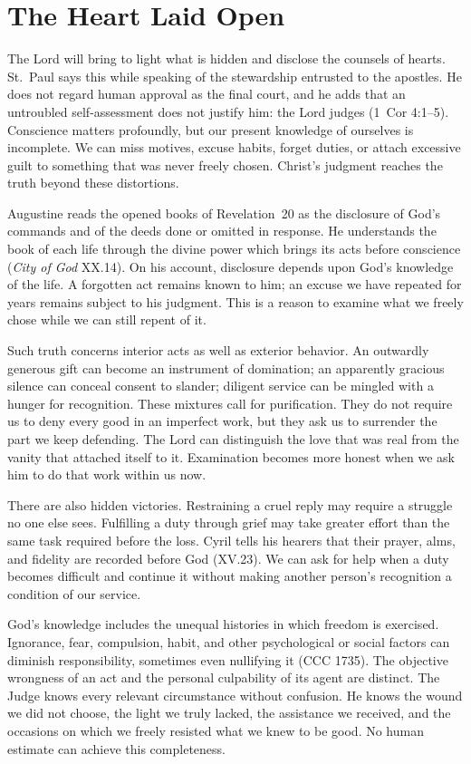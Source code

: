\section{The Heart Laid Open}

The Lord will bring to light what is hidden and disclose the counsels of hearts. St.~Paul says this while speaking of the stewardship entrusted to the apostles. He does not regard human approval as the final court, and he adds that an untroubled self-assessment does not justify him: the Lord judges (1~Cor 4:1--5). Conscience matters profoundly, but our present knowledge of ourselves is incomplete. We can miss motives, excuse habits, forget duties, or attach excessive guilt to something that was never freely chosen. Christ's judgment reaches the truth beyond these distortions.

Augustine reads the opened books of Revelation~20 as the disclosure of God's commands and of the deeds done or omitted in response. He understands the book of each life through the divine power which brings its acts before conscience (\emph{City of God} XX.14). On his account, disclosure depends upon God's knowledge of the life. A forgotten act remains known to him; an excuse we have repeated for years remains subject to his judgment. This is a reason to examine what we freely chose while we can still repent of it.

Such truth concerns interior acts as well as exterior behavior. An outwardly generous gift can become an instrument of domination; an apparently gracious silence can conceal consent to slander; diligent service can be mingled with a hunger for recognition. These mixtures call for purification. They do not require us to deny every good in an imperfect work, but they ask us to surrender the part we keep defending. The Lord can distinguish the love that was real from the vanity that attached itself to it. Examination becomes more honest when we ask him to do that work within us now.

There are also hidden victories. Restraining a cruel reply may require a struggle no one else sees. Fulfilling a duty through grief may take greater effort than the same task required before the loss. Cyril tells his hearers that their prayer, alms, and fidelity are recorded before God (XV.23). We can ask for help when a duty becomes difficult and continue it without making another person's recognition a condition of our service.

God's knowledge includes the unequal histories in which freedom is exercised. Ignorance, fear, compulsion, habit, and other psychological or social factors can diminish responsibility, sometimes even nullifying it (CCC 1735). The objective wrongness of an act and the personal culpability of its agent are distinct. The Judge knows every relevant circumstance without confusion. He knows the wound we did not choose, the light we truly lacked, the assistance we received, and the occasions on which we freely resisted what we knew to be good. No human estimate can achieve this completeness.

